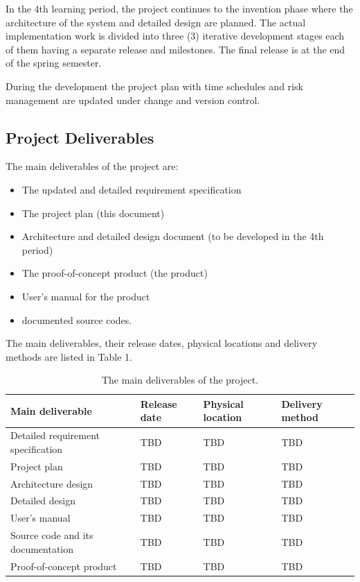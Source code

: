 \documentclass{article}
\begin{document}
In the 4th learning period, the project continues to the invention phase where the
architecture of the system and detailed design are planned. The actual
implementation work is divided into three (3) iterative development stages each
of them having a separate release and milestones. The final release is at the end
of the spring semester.

During the development the project plan with time schedules and risk
management are updated under change and version control.


\subsection{Project Deliverables}
The main deliverables of the project are:
\begin{itemize}
\item The updated and detailed requirement specification
\item The project plan (this document)
\item Architecture and detailed design document (to be developed in the 4th period)
\item The proof-of-concept product (the product)
\item User's manual for the product
\item documented source codes.
\end{itemize}


The main deliverables, their release dates, physical locations and delivery
methods are listed in Table 1.

\begin{table}[h]
\centering
\caption{The main deliverables of the project.}
\label{tab:my_label}
\begin{tabular}{|l|l|l|l|}
\hline
\textbf{Main deliverable} & \textbf{Release date} & \textbf{Physical location} & \textbf{Delivery method} \\
\hline
Detailed requirement specification & TBD & TBD & TBD \\
\hline
Project plan & TBD & TBD & TBD \\
\hline
Architecture design & TBD & TBD & TBD \\
\hline
Detailed design & TBD & TBD & TBD \\
\hline
User’s manual & TBD & TBD & TBD \\
\hline
Source code and its documentation & TBD & TBD & TBD \\
\hline
Proof-of-concept product & TBD & TBD & TBD \\
\hline
\end{tabular}
\end{table}
\end{document}
